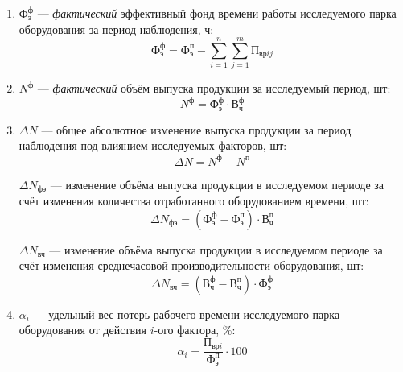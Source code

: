 \begin{enumerate}
  \item $ \text{Ф}^{\text{ф}}_{\text{э}} $ --- \textit{фактический} эффективный фонд времени работы
    исследуемого парка оборудования за период наблюдения, ч:
    \begin{equation*}
      \text{Ф}^{\text{ф}}_{\text{э}} =
      \text{Ф}^{\text{п}}_{\text{э}} - \sum\limits_{i=1}^{n}\sum\limits_{j=1}^{m} \text{П}_{\text{вр}ij}
    \end{equation*}

  \item $ N^{\text{ф}} $ --- \textit{фактический} объём выпуска продукции за исследуемый период, шт:
    \begin{equation*}
      N^{\text{ф}} = \text{Ф}^{\text{ф}}_{\text{э}} \cdot \text{В}^{\text{ф}}_{\text{ч}}
    \end{equation*}

  \item $ \Delta N $ --- общее абсолютное изменение выпуска продукции за период наблюдения
    под влиянием исследуемых факторов, шт:
    \begin{equation*}
      \Delta N = N^{\text{ф}} - N^{\text{п}}
    \end{equation*}

    $ \Delta N_{\text{фэ}} $ --- изменение объёма выпуска продукции в исследуемом периоде
    за счёт изменения количества отработанного оборудованием времени, шт:
    \begin{equation*}
      \Delta N_{\text{фэ}} = (\text{Ф}^{\text{ф}}_{\text{э}} - \text{Ф}^{\text{п}}_{\text{э}}) \cdot \text{В}^{\text{п}}_{\text{ч}}
    \end{equation*}

    $ \Delta N_{\text{вч}} $ --- изменение объёма выпуска продукции в исследуемом периоде
    за счёт изменения среднечасовой производительности оборудования, шт:
    \begin{equation*}
      \Delta N_{\text{вч}} = (\text{В}^{\text{ф}}_{\text{ч}} - \text{В}^{\text{п}}_{\text{ч}}) \cdot \text{Ф}^{\text{ф}}_{\text{э}}
    \end{equation*}

  \item $ \alpha_i $ --- удельный вес потерь рабочего времени исследуемого парка оборудования от
    действия $i$-ого фактора, \%:
    \begin{equation*}
      \alpha_i = \dfrac{\text{П}_{\text{вр}i}}{\text{Ф}^{\text{п}}_{\text{э}}} \cdot 100
    \end{equation*}


\end{enumerate}
